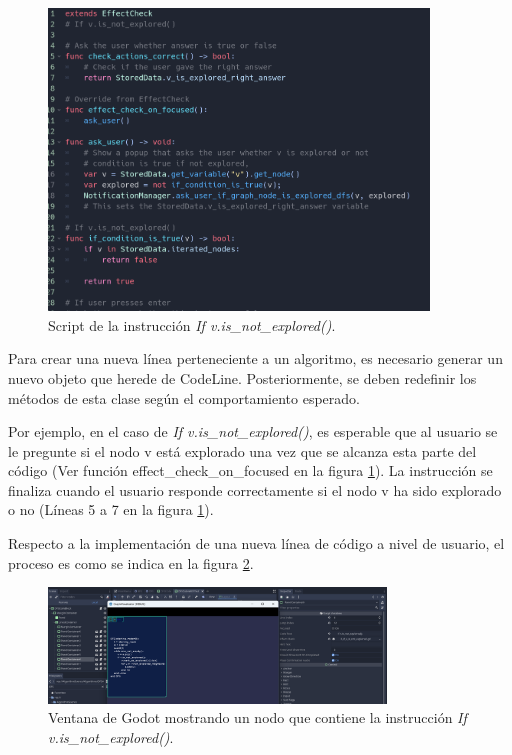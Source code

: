 \begin{figure}[h!]
	\centering
	\includegraphics[width=0.9\textwidth]{imagenes/v_is_not_explored_effect_check_1.png}
	\caption{Script de la instrucción \emph{If v.is\_not\_explored()}.}
	\label{v_is_not_explored_effect_check}
\end{figure}



Para crear una nueva línea perteneciente a un algoritmo, es necesario generar un nuevo objeto que herede de CodeLine. Posteriormente, se deben redefinir los métodos de esta clase según el comportamiento esperado. 

Por ejemplo, en el caso de \emph{If v.is\_not\_explored()}, es esperable que al usuario se le pregunte si el nodo v está explorado una vez que se alcanza esta parte del código (Ver función effect\_check\_on\_focused en la figura \ref{v_is_not_explored_effect_check}). La instrucción se finaliza cuando el usuario responde correctamente si el nodo v ha sido explorado o no (Líneas 5 a 7 en la figura \ref{v_is_not_explored_effect_check}).

Respecto a la implementación de una nueva línea de código a nivel de usuario, el proceso es como se indica en la figura \ref{Godot_v_is_not_explored}. 

\begin{figure}[!h]
	\centering
	\includegraphics[width=0.8\textwidth]{imagenes/DFS_if_v_is_not_explored.png}
	\caption{Ventana de Godot mostrando un nodo que contiene la instrucción \emph{If v.is\_not\_explored()}.}
	\label{Godot_v_is_not_explored}
\end{figure}

